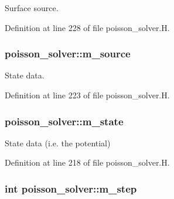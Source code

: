 Surface source. 



Definition at line 228 of file poisson\+\_\+solver.\+H.

\subsubsection[{\texorpdfstring{m\+\_\+source}{m_source}}]{ poisson\+\_\+solver\+::m\+\_\+source\hspace{0.3cm}{\ttfamily [protected]}}\hypertarget{classpoisson__solver_ae5da801240340890973eb15e851c736a}{}\label{classpoisson__solver_ae5da801240340890973eb15e851c736a}


State data. 



Definition at line 223 of file poisson\+\_\+solver.\+H.

\subsubsection[{\texorpdfstring{m\+\_\+state}{m_state}}]{ poisson\+\_\+solver\+::m\+\_\+state\hspace{0.3cm}{\ttfamily [protected]}}\hypertarget{classpoisson__solver_a17fd22a61afb4fa05d0aa9ff13940d89}{}\label{classpoisson__solver_a17fd22a61afb4fa05d0aa9ff13940d89}


State data (i.\+e. the potential) 



Definition at line 218 of file poisson\+\_\+solver.\+H.

\subsubsection[{\texorpdfstring{m\+\_\+step}{m_step}}]{\setlength{\rightskip}{0pt plus 5cm}int poisson\+\_\+solver\+::m\+\_\+step\hspace{0.3cm}{\ttfamily [protected]}}\hypertarget{classpoisson__solver_a4e2d10e5e86970b7dccb274e8caadcb3}{}\label{classpoisson__solver_a4e2d10e5e86970b7dccb274e8caadcb3}


